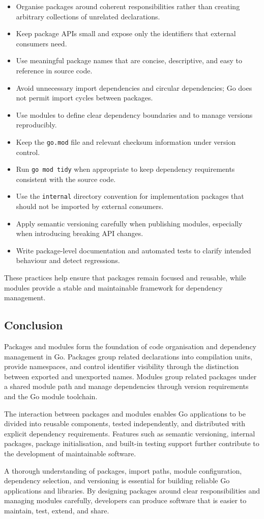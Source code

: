 \begin{itemize}
    \item Organise packages around coherent responsibilities rather than creating arbitrary collections of unrelated declarations.
    \item Keep package APIs small and expose only the identifiers that external consumers need.
    \item Use meaningful package names that are concise, descriptive, and easy to reference in source code.
    \item Avoid unnecessary import dependencies and circular dependencies; Go does not permit import cycles between packages.
    \item Use modules to define clear dependency boundaries and to manage versions reproducibly.
    \item Keep the \texttt{go.mod} file and relevant checksum information under version control.
    \item Run \texttt{go mod tidy} when appropriate to keep dependency requirements consistent with the source code.
    \item Use the \texttt{internal} directory convention for implementation packages that should not be imported by external consumers.
    \item Apply semantic versioning carefully when publishing modules, especially when introducing breaking API changes.
    \item Write package-level documentation and automated tests to clarify intended behaviour and detect regressions.
\end{itemize}

These practices help ensure that packages remain focused and reusable, while modules provide a stable and maintainable framework for dependency management.

\subsection{Conclusion}

Packages and modules form the foundation of code organisation and dependency management in Go. Packages group related declarations into compilation units, provide namespaces, and control identifier visibility through the distinction between exported and unexported names. Modules group related packages under a shared module path and manage dependencies through version requirements and the Go module toolchain.

The interaction between packages and modules enables Go applications to be divided into reusable components, tested independently, and distributed with explicit dependency requirements. Features such as semantic versioning, internal packages, package initialisation, and built-in testing support further contribute to the development of maintainable software.

A thorough understanding of packages, import paths, module configuration, dependency selection, and versioning is essential for building reliable Go applications and libraries. By designing packages around clear responsibilities and managing modules carefully, developers can produce software that is easier to maintain, test, extend, and share.

